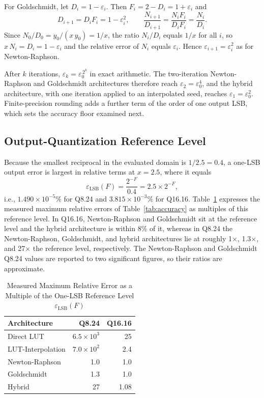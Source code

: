 \documentclass[manuscript,screen,review]{acmart}
\begin{document}
For Goldschmidt, let $D_i = 1 - \varepsilon_i$. Then $F_i = 2 - D_i = 1 + \varepsilon_i$ and
\begin{equation}
D_{i+1} = D_i F_i = 1 - \varepsilon_i^2, \qquad \frac{N_{i+1}}{D_{i+1}} = \frac{N_i F_i}{D_i F_i} = \frac{N_i}{D_i}.
\label{eq:app_gold}
\end{equation}
Since $N_0/D_0 = y_0/(x\,y_0) = 1/x$, the ratio $N_i/D_i$ equals $1/x$ for all $i$, so $x\,N_i = D_i = 1 - \varepsilon_i$ and the relative error of $N_i$ equals $\varepsilon_i$. Hence $\varepsilon_{i+1} = \varepsilon_i^2$ as for Newton-Raphson.
 
After $k$ iterations, $\varepsilon_k = \varepsilon_0^{\,2^k}$ in exact arithmetic. The two-iteration Newton-Raphson and Goldschmidt architectures therefore reach $\varepsilon_2 = \varepsilon_0^{4}$, and the hybrid architecture, with one iteration applied to an interpolated seed, reaches $\varepsilon_1 = \varepsilon_0^{2}$. Finite-precision rounding adds a further term of the order of one output LSB, which sets the accuracy floor examined next.
 
\subsection{Output-Quantization Reference Level}
\label{app:lsbfloor}
 
Because the smallest reciprocal in the evaluated domain is $1/2.5 = 0.4$, a one-LSB output error is largest in relative terms at $x = 2.5$, where it equals
\begin{equation}
\varepsilon_{\mathrm{LSB}}(F) = \frac{2^{-F}}{0.4} = 2.5\times 2^{-F},
\label{eq:app_lsb}
\end{equation}
i.e., $1.490\times10^{-5}\%$ for Q8.24 and $3.815\times10^{-3}\%$ for Q16.16. Table~\ref{tab:app_lsbfloor} expresses the measured maximum relative errors of Table~\ref{tab:accuracy} as multiples of this reference level. In Q16.16, Newton-Raphson and Goldschmidt sit at the reference level and the hybrid architecture is within 8\% of it, whereas in Q8.24 the Newton-Raphson, Goldschmidt, and hybrid architectures lie at roughly 1$\times$, 1.3$\times$, and 27$\times$ the reference level, respectively. The Newton-Raphson and Goldschmidt Q8.24 values are reported to two significant figures, so their ratios are approximate.
 
\begin{table}[htbp]
\caption{Measured Maximum Relative Error as a Multiple of the One-LSB Reference Level $\varepsilon_{\mathrm{LSB}}(F)$}
\label{tab:app_lsbfloor}
\begin{tabular}{@{}lrr@{}}
\toprule
\textbf{Architecture} & \textbf{Q8.24} & \textbf{Q16.16} \\
\midrule
Direct LUT & $6.5\times10^{3}$ & 25 \\
LUT-Interpolation & $7.0\times10^{2}$ & 2.4 \\
Newton-Raphson & 1.0 & 1.0 \\
Goldschmidt & 1.3 & 1.0 \\
Hybrid & 27 & 1.08 \\
\bottomrule
\end{tabular}
\end{table}
 
\end{document}
